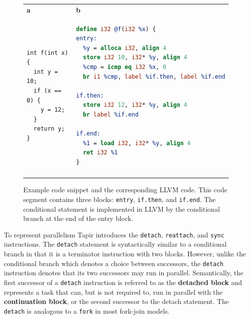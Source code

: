 \documentclass[sigconf]{acmart}
\newcommand{\figlabel}[1]   {\label{fig:#1}}
\newcommand{\subfiglabel}[1]    {\textbf{#1}}
\def\code{\lstinline[basicstyle=\ttfamily\color{CodeColor}]}
\begin{document}
\begin{figure}[h!]
  \begin{tabular*}{\linewidth}{@{\extracolsep{\fill}}ll}

    \subfiglabel{a} & \subfiglabel{b} \\
\begin{minipage}[T]{0.45\linewidth}
      \begin{lstlisting}
int f(int x) {
  int y = 10;
  if (x == 0) {
    y = 12;
  }
  return y;
}
      \end{lstlisting}
    \end{minipage}
&
    \begin{minipage}[T]{0.45\linewidth}
\begin{lstlisting}[language=llvm]
define i32 @f(i32 %x) {
entry:
  %y = alloca i32, align 4
  store i32 10, i32* %y, align 4
  %cmp = icmp eq i32 %x, 0
  br i1 %cmp, label %if.then, label %if.end

if.then:
  store i32 12, i32* %y, align 4
  br label %if.end

if.end:
  %1 = load i32, i32* %y, align 4
  ret i32 %1
}
\end{lstlisting}
    \end{minipage}\\
    \addlinespace[2ex]
    \bottomrule
  \end{tabular*}
  \caption{Example code snippet and the corresponding LLVM code. This code segment contains three blocks: \code{entry}, \code{if.then}, and \code{if.end}. The conditional statement is implemented in LLVM by the conditional branch at the end of the entry block. }
  \figlabel{CFG}
  \vspace{-.4cm}
\end{figure}

To represent parallelism Tapir introduces the \code{detach}, \code{reattach}, and
\code{sync} instructions. The \code{detach} statement is syntactically similar to
a conditional branch in that it is a terminator instruction with two blocks.
However, unlike the conditional branch which denotes a choice between successors, the \code{detach} instruction denotes that its two successors may run in parallel. Semantically,
the first successor of a \code{detach} instruction is referred to as the \textbf{detached block} and represents a task that can, but is not required to, run in parallel with the
\textbf{continuation block}, or the second successor to the detach statement. The \code{detach}
is analogous to a \code{fork} in most fork-join models.
\end{document}
